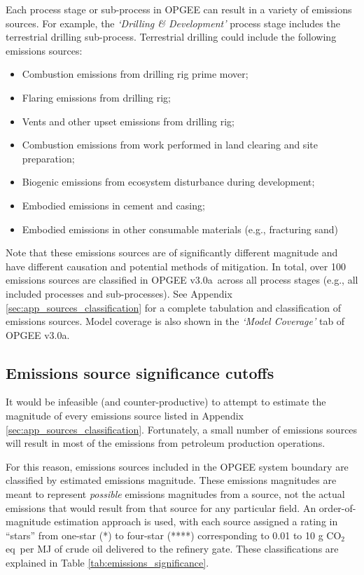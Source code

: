 \documentclass[11pt]{report}
\newcommand{\version}{v3.0a}
\newcommand{\sheet}[1]{\textit{`{#1}'}}
\begin{document}
Each process stage or sub-process in OPGEE can result in a variety of emissions sources. For example, the \sheet{Drilling \& Development} process stage includes the terrestrial drilling sub-process. Terrestrial drilling could include the following emissions sources:
\begin{itemize}
\item Combustion emissions from drilling rig prime mover;
\item Flaring emissions from drilling rig;
\item Vents and other upset emissions from drilling rig;
\item Combustion emissions from work performed in land clearing and site preparation;
\item Biogenic emissions from ecosystem disturbance during development;
\item Embodied emissions in cement and casing;
\item Embodied emissions in other consumable materials (e.g., fracturing sand)
\end{itemize}
Note that these emissions sources are of significantly different magnitude and have different causation and potential methods of mitigation. In total, over 100 emissions sources are classified in OPGEE \version \, across all process stages (e.g., all included processes and sub-processes). See Appendix \ref{sec:app_sources_classification} for a complete tabulation and classification of emissions sources.  Model coverage is also shown in the \sheet{Model Coverage} tab of OPGEE \version.



\subsection{Emissions source significance cutoffs}

It would be infeasible (and counter-productive) to attempt to estimate the magnitude of every emissions source listed in Appendix \ref{sec:app_sources_classification}. Fortunately, a small number of emissions sources will result in most of the emissions from petroleum production operations. 

For this reason, emissions sources included in the OPGEE system boundary are classified by estimated emissions magnitude. These emissions magnitudes are meant to represent \emph{possible} emissions magnitudes from a source, not the actual emissions that would result from that source for any particular field. An order-of-magnitude estimation approach is used, with each source assigned a rating in ``stars'' from one-star (*) to four-star (****) corresponding to 0.01 to 10 g CO$_2$ eq\ per MJ of crude oil delivered to the refinery gate. These classifications are explained in Table \ref{tab:emissions_significance}.
\end{document}
